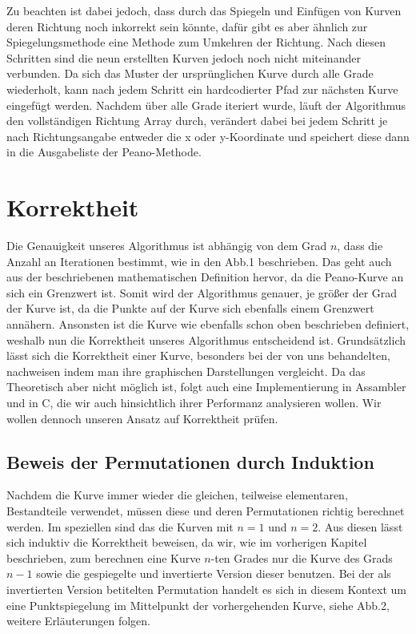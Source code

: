 \documentclass[course=asp]{aspdoc}
\begin{document}
Zu beachten ist dabei jedoch, dass durch das Spiegeln und Einfügen von Kurven deren Richtung noch inkorrekt sein könnte, dafür gibt es aber ähnlich zur Spiegelungsmethode eine Methode zum Umkehren der Richtung. Nach diesen Schritten sind die neun erstellten Kurven jedoch noch nicht miteinander verbunden. Da sich das Muster der ursprünglichen Kurve durch alle Grade wiederholt, kann nach jedem Schritt ein hardcodierter Pfad zur nächsten Kurve eingefügt werden.
Nachdem über alle Grade iteriert wurde, läuft der Algorithmus den vollständigen Richtung Array durch, verändert dabei bei jedem Schritt je nach Richtungsangabe entweder die x oder y-Koordinate und speichert diese dann in die Ausgabeliste der Peano-Methode.

\newpage

\section{Korrektheit} %

Die Genauigkeit unseres Algorithmus ist abhängig von dem Grad $n$, dass die Anzahl an Iterationen bestimmt, wie in den Abb.1 beschrieben. Das geht auch aus der beschriebenen mathematischen Definition hervor, da die Peano-Kurve an sich ein Grenzwert ist. Somit wird der Algorithmus genauer, je größer der Grad der Kurve ist, da die Punkte auf der Kurve sich ebenfalls einem Grenzwert annähern. Ansonsten ist die Kurve wie ebenfalls schon oben beschrieben definiert, weshalb nun die Korrektheit unseres Algorithmus entscheidend ist.
Grundsätzlich lässt sich die Korrektheit einer Kurve, besonders bei der von uns behandelten, nachweisen indem man ihre graphischen Darstellungen vergleicht. Da das Theoretisch aber nicht möglich ist, folgt auch eine Implementierung in Assambler und in C, die wir auch hinsichtlich ihrer Performanz analysieren wollen.
Wir wollen dennoch unseren Ansatz auf Korrektheit prüfen.

\subsection{Beweis der Permutationen durch Induktion}
Nachdem die Kurve immer wieder die gleichen, teilweise elementaren, Bestandteile verwendet, müssen diese und deren Permutationen richtig berechnet werden. Im speziellen sind das die Kurven mit $n = 1$ und $n = 2$. Aus diesen lässt sich induktiv die Korrektheit beweisen, da wir, wie im vorherigen Kapitel beschrieben, zum berechnen eine Kurve $n$-ten Grades nur die Kurve des Grads $n - 1$ sowie die gespiegelte und invertierte Version dieser benutzen. Bei der als invertierten Version betitelten Permutation handelt es sich in diesem Kontext um eine Punktspiegelung im Mittelpunkt der vorhergehenden Kurve, siehe Abb.2, weitere Erläuterungen folgen.	%
\end{document}
